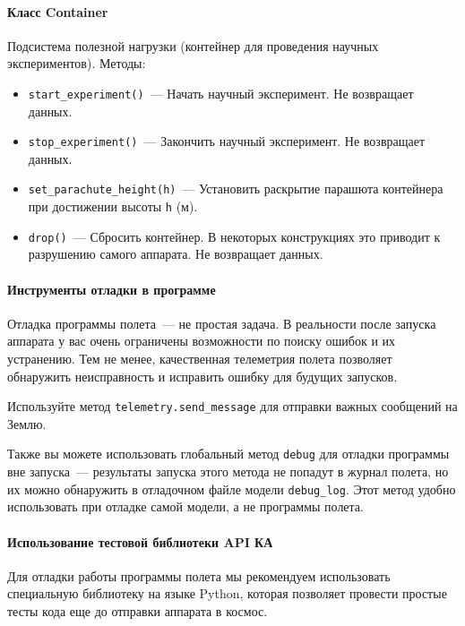 \documentclass[12pt,a4paper]{article}
\begin{document}
\paragraph{Класс Container}

Подсистема полезной нагрузки (контейнер для проведения научных экспериментов). Методы:

\begin{itemize}
\item \verb'start_experiment()'~--- Начать научный эксперимент. Не возвращает данных.
\item \verb'stop_experiment()'~--- Закончить научный эксперимент. Не возвращает данных.
\item \verb'set_parachute_height(h)'~--- Установить раскрытие парашюта контейнера при
  достижении высоты \verb'h' (м).
\item \verb'drop()'~--- Сбросить контейнер. В некоторых конструкциях это приводит к
  разрушению самого аппарата. Не возвращает данных.
\end{itemize}

\paragraph{Инструменты отладки в программе}

Отладка программы полета~--- не простая задача. В реальности после запуска аппарата у вас
очень ограничены возможности по поиску ошибок и их устранению. Тем не менее, качественная
телеметрия полета позволяет обнаружить неисправность и исправить ошибку для будущих
запусков.

Используйте метод \verb'telemetry.send_message' для отправки важных сообщений на Землю.

Также вы можете использовать глобальный метод \verb'debug' для отладки программы вне
запуска~--- результаты запуска этого метода не попадут в журнал полета, но их можно
обнаружить в отладочном файле модели \verb'debug_log'. Этот метод удобно использовать при
отладке самой модели, а не программы полета. 

\paragraph{Использование тестовой библиотеки API КА}

Для отладки работы программы полета мы рекомендуем использовать специальную библиотеку на
языке Python, которая позволяет провести простые тесты кода еще до отправки аппарата в
космос.
\end{document}

